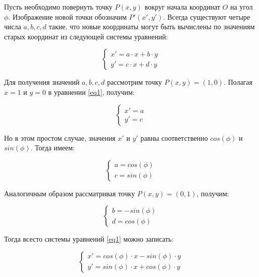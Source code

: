 \documentclass[12pt]{report}
\begin{document}
	Пусть необходимо повернуть точку $P(x,y)$ вокруг начала координат $O$ на угол $\phi$. Изображение новой точки обозначим $P'(x',y')$. Всегда существуют четыре числа $a, b, c, d$ такие, что новые координаты могут быть
	вычислены по значениям старых координат из следующей системы уравнений:
	
	\begin{equation}
		\label{eq1}
		\begin{cases}
			x'=a \cdot x+b \cdot y\\
			y'=c \cdot x+d \cdot y
		\end{cases}
	\end{equation}
	
	Для получения значений $a, b, c, d$ рассмотрим точку $P(x, y) = (1, 0)$. Полагая $x = 1$ и $y = 0$ в уравнении \ref{eq1}, получим:
	
	\begin{equation}
		\begin{cases}
			x'=a\\
			y'=c
		\end{cases}
	\end{equation}
	
	Но в этом простом случае, значения $x'$ и $y'$ равны соответственно $cos(\phi)$ и $sin(\phi)$. Тогда имеем:
	
	\begin{equation}
		\begin{cases}
			a=cos(\phi)\\
			c=sin(\phi)
		\end{cases}
	\end{equation}

	Аналогичным образом рассматривая точку $P(x, y) = (0, 1)$, получим:
	
	\begin{equation}
		\begin{cases}
			b=-sin(\phi)\\
			d=cos(\phi)
		\end{cases}
	\end{equation}

	Тогда всесто системы уравнений \ref{eq1} можно записать:
	
	\begin{equation}
		\label{eq2}
		\begin{cases}
			x'=cos(\phi) \cdot x-sin(\phi) \cdot y\\
			y'=sin(\phi) \cdot x+cos(\phi) \cdot y
		\end{cases}
	\end{equation}
\end{document}

